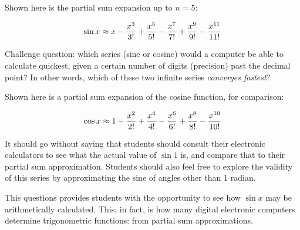 \vskip 10pt

Shown here is the partial sum expansion up to $n = 5$:

$$\sin x \approx x - {x^{3} \over 3!} + {x^{5} \over 5!} - {x^{7} \over 7!} + {x^{9} \over 9!} - {x^{11} \over 11!}$$

\vskip 10pt

Challenge question: which series (sine or cosine) would a computer be able to calculate quickest, given a certain number of digits (precision) past the decimal point?  In other words, which of these two infinite series {\it converges fastest}?

\vskip 10pt

Shown here is a partial sum expansion of the cosine function, for comparison:

$$\cos x \approx 1 - {x^{2} \over 2!} + {x^{4} \over 4!} - {x^{6} \over 6!} + {x^{8} \over 8!} - {x^{10} \over 10!}$$







It should go without saying that students should consult their electronic calculators to see what the actual value of $\sin 1$ is, and compare that to their partial sum approximation.  Students should also feel free to explore the validity of this series by approximating the sine of angles other than 1 radian.

This questions provides students with the opportunity to see how $\sin x$ may be arithmetically calculated.  This, in fact, is how many digital electronic computers determine trigonometric functions: from partial sum approximations.




